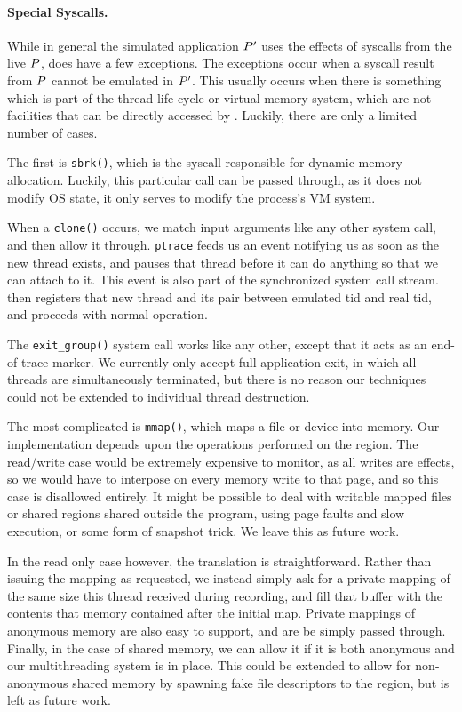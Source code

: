 \paragraph{Special Syscalls.} While in general the simulated application
$P'$ uses the effects of syscalls from the live $P$,
\tachyon does have a few exceptions.  The exceptions occur when a
syscall result from $P$ cannot be emulated in $P'$.
This usually occurs when there is something which is part of the thread
life cycle or virtual memory system, which are not facilities that can
be directly accessed by \tachyon.
Luckily, there are only a limited number of cases.

The first is \texttt{sbrk()}, which is the syscall responsible for
dynamic memory allocation. Luckily, this particular call can be passed
through, as it does not modify OS state, it only serves to modify the
process's VM system.

When a \texttt{clone()} occurs, we match input arguments like any other
system call, and then allow it through. \texttt{ptrace} feeds us an event
notifying us as soon as the new thread exists, and pauses that thread before
it can do anything so that we can attach to it. This event is also part of the
synchronized system call stream. \tachyon then registers that new thread and
its pair between emulated tid and real tid, and proceeds with normal operation.

The \texttt{exit\_group()} system call works like any other, except that it acts as
an end-of trace marker. We currently only accept full application exit, in which
all threads are simultaneously terminated, but there is no reason our techniques
could not be extended to individual thread destruction.

The most complicated is \texttt{mmap()}, which maps a file or device into
memory.  Our implementation depends upon the operations performed on
the region.  The read/write case would be extremely expensive to
monitor, as all writes are effects, so we would have to interpose
on every memory write to that page,
and so this case is disallowed entirely. It might be possible to deal with writable
mapped files or shared regions shared outside the program,
using page faults and slow execution, or some form of snapshot
trick. We leave this as future work.

In the read only case however, the translation is straightforward.
Rather than issuing the mapping as requested, we instead simply ask
for a private mapping of the same size this thread received during
recording, and fill that buffer with the contents that memory
contained after the initial map.
Private mappings of anonymous memory are also easy to support, and are
be simply passed through.
Finally, in the case of shared memory, we can allow it if it is both
anonymous and our multithreading system is in place. This could be
extended to allow for non-anonymous shared memory by spawning fake
file descriptors to the region, but is left as future work.

